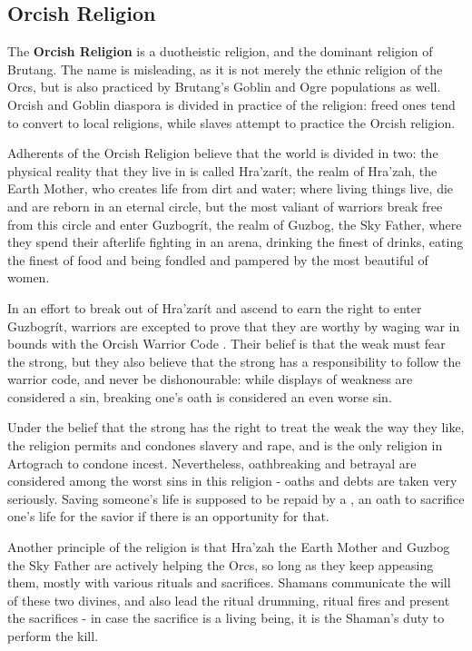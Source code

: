 \subsection{Orcish Religion}


The \textbf{Orcish Religion} is a duotheistic religion, and the dominant religion of Brutang. The name is misleading, as it is not merely the ethnic religion of the Orcs, but is also practiced by Brutang's Goblin and Ogre populations as well. Orcish and Goblin diaspora is divided in practice of the religion: freed ones tend to convert to local religions, while slaves attempt to practice the Orcish religion.

Adherents of the Orcish Religion believe that the world is divided in two: the physical reality that they live in is called Hra'zarít, the realm of Hra'zah, the Earth Mother, who creates life from dirt and water; where living things live, die and are reborn in an eternal circle, but the most valiant of warriors break free from this circle and enter Guzbogrít, the realm of Guzbog, the Sky Father, where they spend their afterlife fighting in an arena, drinking the finest of drinks, eating the finest of food and being fondled and pampered by the most beautiful of women.

In an effort to break out of Hra'zarít and ascend to earn the right to enter Guzbogrít, warriors are excepted to prove that they are worthy by waging war in bounds with the Orcish Warrior Code . Their belief is that the weak must fear the strong, but they also believe that the strong has a responsibility to follow the warrior code, and never be dishonourable: while displays of weakness are considered a sin, breaking one's oath is considered an even worse sin.

Under the belief that the strong has the right to treat the weak the way they like, the religion permits and condones slavery and rape, and is the only religion in Artograch to condone incest. Nevertheless, oathbreaking and betrayal are considered among the worst sins in this religion - oaths and debts are taken very seriously. Saving someone's life is supposed to be repaid by a , an oath to sacrifice one's life for the savior if there is an opportunity for that.

Another principle of the religion is that Hra'zah the Earth Mother and Guzbog the Sky Father are actively helping the Orcs, so long as they keep appeasing them, mostly with various rituals and sacrifices. Shamans communicate the will of these two divines, and also lead the ritual drumming, ritual fires and present the sacrifices - in case the sacrifice is a living being, it is the Shaman's duty to perform the kill. 

